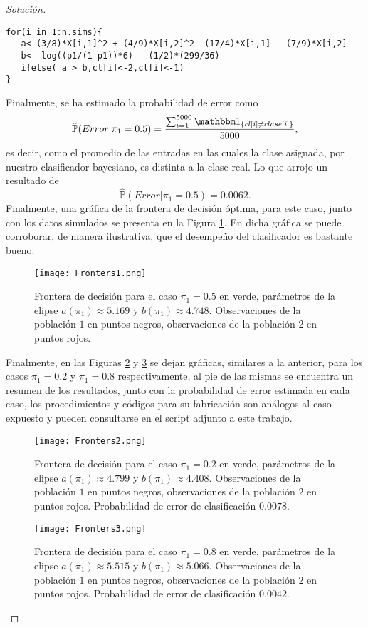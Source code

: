 \documentclass[10.5pt,notitlepage]{article}
\newenvironment{solucion}
  {\begin{proof}[Solución]}
  {\end{proof}}
\newcommand{\PP}{\mathbb{P}}
\newcommand{\kis}[1]{\left\{ #1 \right\}}
\theoremstyle{plain}
\begin{document}
\begin{solucion}
\begin{verbatim}
for(i in 1:n.sims){
   a<-(3/8)*X[i,1]^2 + (4/9)*X[i,2]^2 -(17/4)*X[i,1] - (7/9)*X[i,2]
   b<- log((p1/(1-p1))*6) - (1/2)*(299/36)
   ifelse( a > b,cl[i]<-2,cl[i]<-1) 
}
\end{verbatim}
Finalmente, se ha estimado la probabilidad de error como 
\begin{equation*}
    \hat{\PP}(Error|\pi_1 = 0.5) = \frac{\sum_{i = 1}^{5000}\mathbbm1_{\kis{cl[i] \neq clase[i]}}}{5000},
\end{equation*}
es decir, como el promedio de las entradas en las cuales la clase asignada, por nuestro clasificador bayesiano, es distinta a la clase real. Lo que arrojo un resultado de 
\[
 \hat{\PP}(Error|\pi_1 = 0.5) = 0.0062.
\]
Finalmente, una gráfica de la frontera de decisión óptima, para este caso, junto con los datos simulados se presenta en la Figura \ref{fig:2}. En dicha gráfica se puede corroborar, de manera ilustrativa, que el desempeño del clasificador es bastante bueno.
\begin{figure}[htb]
    \centering
    \texttt{[image: Fronters1.png]}
    \caption{Frontera de decisión para el caso \(\pi_{1} = 0.5\) en verde, parámetros de la elipse \(a(\pi_1) \approx  5.169\) y \(b(\pi_1) \approx  4.748\). Observaciones de la población \(1\) en puntos negros, observaciones de la población \(2\) en puntos rojos.}
    \label{fig:2}
\end{figure}
Finalmente, en las Figuras \ref{fig:3} y \ref{fig:4} se dejan gráficas, similares a la anterior, para los casos \(\pi_1 = 0.2\) y \(\pi_1 =0.8\) respectivamente, al pie de las mismas se encuentra un resumen de los resultados, junto con la probabilidad de error estimada en cada caso, los procedimientos y códigos para su fabricación son análogos al caso expuesto y pueden consultarse en el script adjunto a este trabajo.
\begin{figure}[htb]
    \centering
    \texttt{[image: Fronters2.png]}
    \caption{Frontera de decisión para el caso \(\pi_{1} = 0.2\) en verde, parámetros de la elipse \(a(\pi_1) \approx  4.799\) y \(b(\pi_1) \approx   4.408\). Observaciones de la población \(1\) en puntos negros, observaciones de la población \(2\) en puntos rojos. Probabilidad de error de clasificación \(0.0078\).}
    \label{fig:3}
\end{figure}
\begin{figure}[htb]
    \centering
    \texttt{[image: Fronters3.png]}
    \caption{Frontera de decisión para el caso \(\pi_{1} = 0.8\) en verde, parámetros de la elipse \(a(\pi_1) \approx   5.515\) y \(b(\pi_1) \approx  5.066\). Observaciones de la población \(1\) en puntos negros, observaciones de la población \(2\) en puntos rojos. Probabilidad de error de clasificación \(0.0042\).}
    \label{fig:4}
\end{figure}
\end{solucion}
\end{document}
